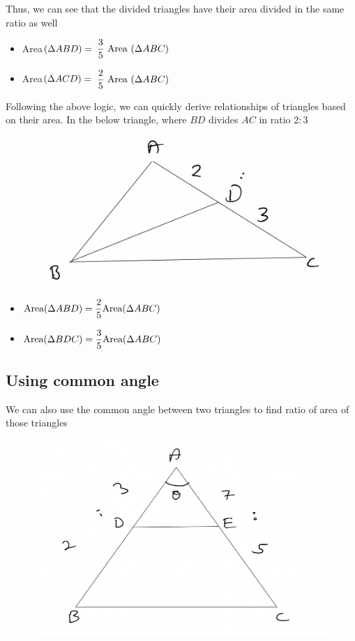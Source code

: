 Thus, we can see that the divided triangles have their area divided in the same ratio as well
\begin{itemize}
    \item Area$(\Delta {ABD}) =$ $\dfrac{3}{5} \text{ Area }(\Delta {ABC})$
    \item Area$(\Delta {ACD}) =$ $\dfrac{2}{5} \text{ Area }(\Delta {ABC})$
\end{itemize}

Following the above logic, we can quickly derive relationships of triangles based on their area. In the below triangle, where $BD$ divides $AC$ in ratio $2:3$

\begin{figure}[h!]
    \centering
    \includegraphics[width=0.4\linewidth]{Quant//Geometry//Images//Triangles/triangle_11_common_height_1.png}
\end{figure}

\begin{itemize}
    \item $\text{Area}({\Delta {ABD}}) = \dfrac{2}{5} \text{Area}({\Delta {ABC}})$
    \item $\text{Area}({\Delta {BDC}}) = \dfrac{3}{5} \text{Area}({\Delta {ABC}})$
\end{itemize}

\vspace{2cm}

\subsection{Using common angle}
We can also use the common angle between two triangles to find ratio of area of those triangles

\begin{figure}[h!]
    \centering
    \includegraphics[width=0.5\linewidth]{./Quant/Geometry/Images/Triangles/triangle_11_common_angle_area.png}
\end{figure}

